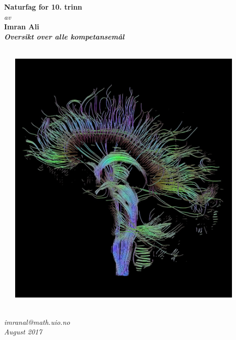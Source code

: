 \documentclass[main.tex]{subfiles}
\begin{document}
\thispagestyle{empty}
\begin{center}        %
  \vspace{5mm}        %
  \LARGE
  \textbf{Naturfag for 10. trinn} \\
  \Large
  \vspace{10mm}
  \textsl{av} \\
  \vspace{2mm}
  \large
  \textbf{Imran Ali} \\
  \vspace{5mm}
  \Large
  {\bf{\textsl{Oversikt over alle kompetansemål}}} \\
  \textsl{} \\
  \vspace{5mm}
  \centerline{\includegraphics[width=125mm,height=125mm]{../figures/DTI-mri_wikipedia.jpg}} 
  \vspace{10mm}
  \textsl{} \\
  \textsl{imranal@math.uio.no} \\
  \vspace{5mm}
  \large
  \textsl{August 2017} \\
  \vspace{2cm}


\end{center}
\end{document}
